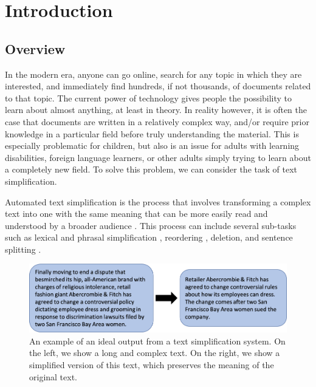\documentclass[thesis.tex]{subfiles}
\begin{document}
\chapter{Introduction}
\label{sec:introduction}

\section{Overview}

In the modern era, anyone can go online, search for any topic in which they are interested, and immediately find hundreds, if not thousands, of documents related to that topic. The current power of technology gives people the possibility to learn about almost anything, at least in theory. In reality however, it is often the case that documents are written in a relatively complex way, and/or require prior knowledge in a particular field before truly understanding the material. This is especially problematic for children, but also is an issue for adults with learning disabilities, foreign language learners, or other adults simply trying to learn about a completely new field. To solve this problem, we can consider the task of text simplification.

Automated text simplification is the process that involves transforming a complex text into one with the same meaning that can be more easily read and understood by a broader audience \citep{saggion2017automatic}. This process can include several sub-tasks such as lexical and phrasal simplification \citep{devlin1998use,shardlow2013cw}, reordering \citep{chandrasekar1997automatic,feblowitz2013sentence}, deletion, and sentence splitting \citep{zhu2010monolingual}. 

\begin{figure}[H]
    \centering
\includegraphics[width=\linewidth]{pictures/intro_example.png}
\caption{An example of an ideal output from a text simplification system. On the left, we show a long and complex text. On the right, we show a simplified version of this text, which preserves the meaning of the original text.}
\label{fig:intro_example}
\end{figure}
\end{document}
